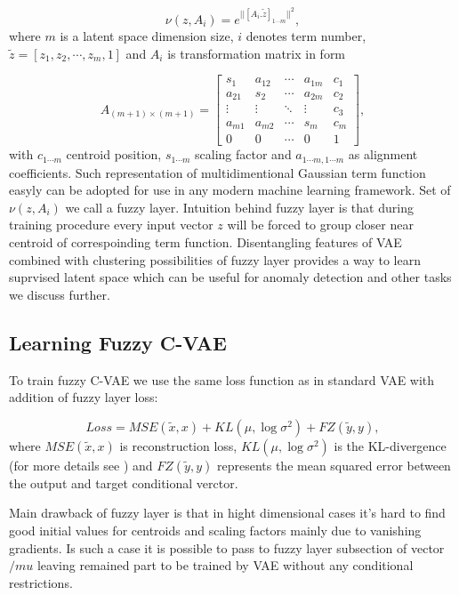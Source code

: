 \documentclass[runningheads]{llncs}
\begin{document}
\[ 
   \nu(z, A_i) = e^{|| [A_i . \tilde{z}]_{1 \cdots m} ||^2},
\]
where $m$ is a latent space dimension size, $i$ denotes term number, $\tilde{z} = [z_1, z_2, \cdots, z_m, 1]$ and $A_i$ is transformation matrix in form 

\[ 
    A_{(m+1) \times (m+1)}= 
    \begin{bmatrix}
        s_{1} & a_{12} & \cdots & a_{1m} & c_{1}\\
        a_{21} & s_{2} & \cdots & a_{2m} & c_{2}\\
        \vdots & \vdots & \ddots & \vdots & c_{3}\\
        a_{m1} & a_{m2} & \cdots & s_{m} & c_{m}\\
        0 & 0 & \cdots & 0 & 1
    \end{bmatrix},
\]
with $c_{1\cdots m}$ centroid position, $s_{1\cdots m}$ scaling factor and $a_{1\cdots m, 1\cdots m}$ as alignment coefficients.
Such representation of multidimentional Gaussian term function easyly can be adopted for use in any modern machine learning framework.
Set of $\nu(z, A_i)$ we call a fuzzy layer.
Intuition behind fuzzy layer is that during training procedure every input vector $z$ will be forced to group closer near centroid of correspoinding term function.
Disentangling features of VAE combined with clustering possibilities of fuzzy layer provides a way to learn suprvised latent space which can be useful for anomaly detection and other tasks we discuss further.

\subsection{Learning Fuzzy C-VAE}

To train fuzzy C-VAE we use the same loss function as in standard VAE with addition of fuzzy layer loss:

\[
    Loss = MSE(\tilde{x}, x) + KL(\mu, \log{\sigma^2}) + FZ(\tilde{y}, y),
\]
where $MSE(\tilde{x}, x)$ is reconstruction loss, $KL(\mu, \log{\sigma^2})$ is the KL-divergence (for more details see \cite{kingma2022autoencoding}) and $FZ(\tilde{y}, y)$ represents the mean squared error between the output and target conditional verctor.

Main drawback of fuzzy layer is that in hight dimensional cases it's hard to find good initial values for centroids and scaling factors mainly due to vanishing gradients.
Is such a case it is possible to pass to fuzzy layer subsection of vector $/mu$ leaving remained part to be trained by VAE without any conditional restrictions. 
\end{document}
